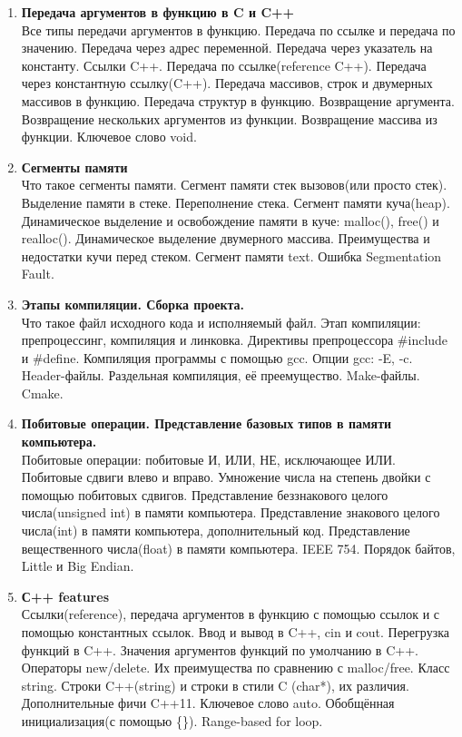 \documentclass{article}
\begin{document}
\begin{enumerate}
\item \textbf{Передача аргументов в функцию в C и C++}\\
Все типы передачи аргументов в функцию. Передача по ссылке и передача по значению. Передача через адрес переменной. Передача через указатель на константу. Ссылки C++. Передача по ссылке(reference C++). Передача через константную ссылку(C++). Передача массивов, строк и двумерных массивов в функцию. Передача структур в функцию. Возвращение аргумента. Возвращение нескольких аргументов из функции. Возвращение массива из функции. Ключевое слово void. 

\item \textbf{Сегменты памяти}\\
Что такое сегменты памяти. Сегмент памяти стек вызовов(или просто стек). Выделение памяти в стеке. Переполнение стека. Сегмент памяти куча(heap). Динамическое выделение и освобождение памяти в куче: malloc(), free() и realloc(). Динамическое выделение двумерного массива. Преимущества и недостатки кучи перед стеком. Сегмент памяти text. Ошибка Segmentation Fault.

\item \textbf{Этапы компиляции. Сборка проекта.}\\
Что такое файл исходного кода и исполняемый файл. Этап компиляции: препроцессинг, компиляция и линковка. Директивы препроцессора \#include и \#define. Компиляция программы с помощью gcc. Опции gcc: -E, -c. Header-файлы. Раздельная компиляция, её преемущество. Make-файлы. Cmake.

\item \textbf{Побитовые операции. Представление базовых типов в памяти компьютера.}\\
Побитовые операции: побитовые И, ИЛИ, НЕ, исключающее ИЛИ. Побитовые сдвиги влево и вправо. Умножение числа на степень двойки  с помощью побитовых сдвигов. Представление беззнакового целого числа(unsigned int) в памяти компьютера. Представление знакового целого числа(int) в памяти компьютера, дополнительный код. Представление вещественного числа(float) в памяти компьютера. IEEE 754. Порядок байтов, Little и Big Endian.

\item \textbf{С++ features}\\
Ссылки(reference), передача аргументов в функцию с помощью ссылок и с помощью константных ссылок. Ввод и вывод в C++, cin и cout. Перегрузка функций в C++. Значения аргументов функций по умолчанию в C++. Операторы new/delete. Их преимущества по сравнению с malloc/free. Класс string. Строки C++(string) и строки в стили C (char*), их различия.\\
Дополнительные фичи C++11. Ключевое слово auto. Обобщённая инициализация(с помощью \{\}). Range-based for loop.


\end{enumerate}
\end{document}
